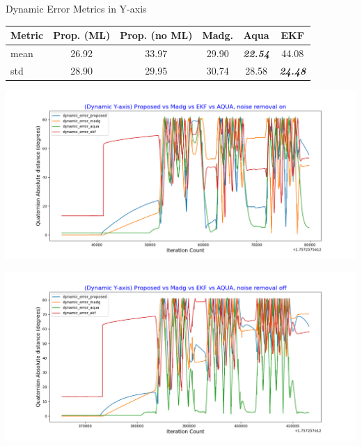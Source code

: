 \documentclass[aspectratio=169,xcolor=dvipsnames]{beamer}
\begin{document}
\begin{frame}{Dynamic Error Metrics in Y-axis}
\small
\begin{minipage}{\textwidth}
  \centering
  \scriptsize
  \label{tab:dynamic_y}
  \begin{tabular}{lccccc}
    \toprule
    Metric & Prop. (ML) & Prop. (no ML) & Madg. & Aqua & EKF \\
    \midrule
    mean & 26.92 & 33.97 & 29.90 & \textit{\textbf{22.54}} & 44.08 \\
    std & 28.90 & 29.95 & 30.74 & 28.58 & \textit{\textbf{24.48}} \\
    \bottomrule
  \end{tabular}
\end{minipage}

\vspace{0.5cm}

\begin{minipage}{0.5\textwidth}
  \centering
  \includegraphics[width=\linewidth,height=0.35\textheight]{graphs/dynamic_ml_y.png}
\end{minipage}%
\hfill
\begin{minipage}{0.5\textwidth}
  \centering
  \includegraphics[width=\linewidth]{graphs/dynamic_no_ml_y.png}
\end{minipage}

\end{frame}
\end{document}
